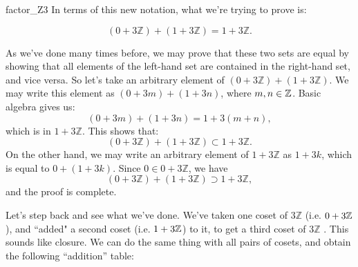 {\begin{example}{factor_Z3}
In terms of this new notation, what we're trying to prove is:

\[ (0 + 3 {\mathbb Z}) + (1 + 3 {\mathbb Z}) = 1 + 3 {\mathbb Z}. \]

As we've done many times before, we may prove that these two sets are equal by showing that all elements of the left-hand set are contained in the right-hand set, and vice versa. So let's take an arbitrary element of $(0 + 3 {\mathbb Z}) + (1 + 3 {\mathbb Z})$. We may write this element as $(0 + 3m) + (1 + 3n)$, where $m,n \in \mathbb{Z}$. Basic algebra gives us:
\[(0 + 3m) + (1 + 3 n) = 1 + 3(m+ n), \]
which is in $1 + 3 {\mathbb Z}$. This shows that: 
\[ (0 + 3 {\mathbb Z}) + (1 + 3 {\mathbb Z}) \subset 1 + 3 {\mathbb Z}. \]
On the other hand, we may write an arbitrary element of $1 + 3 {\mathbb Z}$ as $1 + 3k$, which is equal to  $0 + (1 + 3k)$.  Since $0 \in 0 + 3 {\mathbb Z}$, we have 
\[ (0 + 3 {\mathbb Z}) + (1 + 3 {\mathbb Z}) \supset 1 + 3 {\mathbb Z}, \]
and the proof is complete.

%
%
%
%
%

Let's step back and see what we've done. We've taken one coset of $ 3 {\mathbb Z}$ (i.e. $0 + 3\mathbb{Z}$), and ``added" a second coset (i.e. $1 + 3\mathbb{Z}$) to it, to get a third coset of $ 3 {\mathbb Z}$ . This sounds like closure.  We can do the same thing with all pairs of cosets, and obtain the following ``addition'' table: 


\end{example}}
